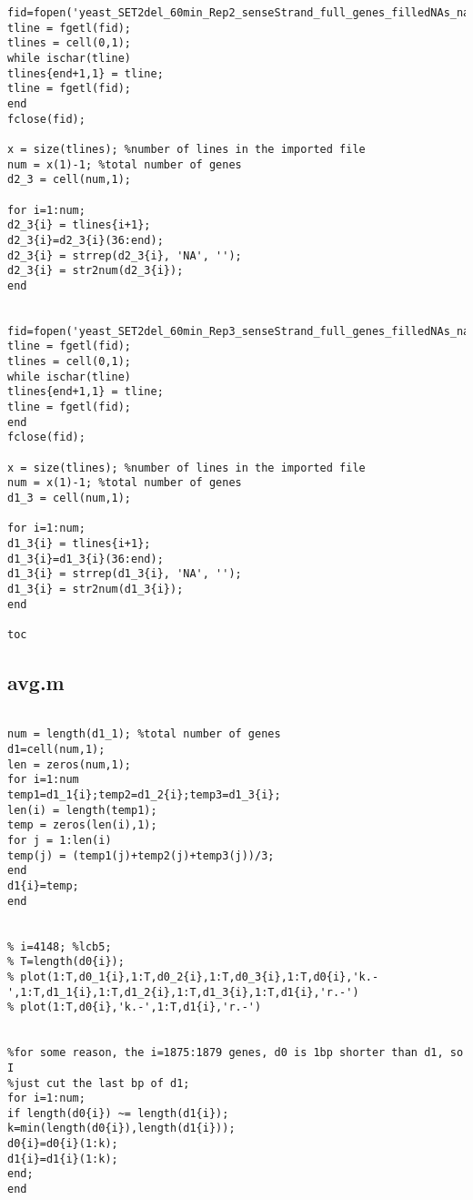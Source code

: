 \documentclass{article}
\begin{document}
\begin{lstlisting}[frame=single]
fid=fopen('yeast_SET2del_60min_Rep2_senseStrand_full_genes_filledNAs_named.coord');
tline = fgetl(fid);
tlines = cell(0,1);
while ischar(tline)
tlines{end+1,1} = tline;
tline = fgetl(fid);
end
fclose(fid);

x = size(tlines); %number of lines in the imported file
num = x(1)-1; %total number of genes
d2_3 = cell(num,1);

for i=1:num;
d2_3{i} = tlines{i+1};
d2_3{i}=d2_3{i}(36:end);
d2_3{i} = strrep(d2_3{i}, 'NA', '');
d2_3{i} = str2num(d2_3{i});
end


fid=fopen('yeast_SET2del_60min_Rep3_senseStrand_full_genes_filledNAs_named.coord');
tline = fgetl(fid);
tlines = cell(0,1);
while ischar(tline)
tlines{end+1,1} = tline;
tline = fgetl(fid);
end
fclose(fid);

x = size(tlines); %number of lines in the imported file
num = x(1)-1; %total number of genes
d1_3 = cell(num,1);

for i=1:num;
d1_3{i} = tlines{i+1};
d1_3{i}=d1_3{i}(36:end);
d1_3{i} = strrep(d1_3{i}, 'NA', '');
d1_3{i} = str2num(d1_3{i});
end

toc
\end{lstlisting}


\subsection{avg.m} \label{avg}
\begin{lstlisting}[frame=single]
%calculate the average of three repeats, and get d0, d1 respectively

num = length(d1_1); %total number of genes
d1=cell(num,1);
len = zeros(num,1);
for i=1:num
temp1=d1_1{i};temp2=d1_2{i};temp3=d1_3{i};
len(i) = length(temp1);
temp = zeros(len(i),1);
for j = 1:len(i)
temp(j) = (temp1(j)+temp2(j)+temp3(j))/3;
end
d1{i}=temp;
end


% i=4148; %lcb5;
% T=length(d0{i});
% plot(1:T,d0_1{i},1:T,d0_2{i},1:T,d0_3{i},1:T,d0{i},'k.-',1:T,d1_1{i},1:T,d1_2{i},1:T,d1_3{i},1:T,d1{i},'r.-')
% plot(1:T,d0{i},'k.-',1:T,d1{i},'r.-')


%for some reason, the i=1875:1879 genes, d0 is 1bp shorter than d1, so I
%just cut the last bp of d1;
for i=1:num; 
if length(d0{i}) ~= length(d1{i});
k=min(length(d0{i}),length(d1{i}));
d0{i}=d0{i}(1:k);
d1{i}=d1{i}(1:k);
end;
end
\end{lstlisting}
\end{document}
